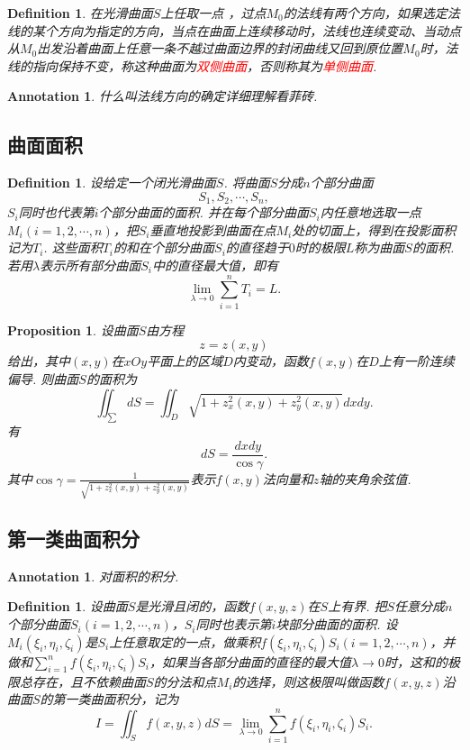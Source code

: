 \documentclass{article}
\newtheorem{proposition}[theorem]{Proposition}
\newtheorem{definition}[theorem]{Definition}
\newtheorem{annotation}[theorem]{Annotation}
\newcommand{\redt}[1]{\textcolor{red}{#1}}
\begin{document}
\begin{definition}
\rm 在光滑曲面$S$上任取一点 ，过点$M_0$的法线有两个方向，如果选定法线的某个方向为指定的方向，当点在曲面上连续移动时，法线也连续变动、当动点从$M_0$出发沿着曲面上任意一条不越过曲面边界的封闭曲线又回到原位置$M_0$时，法线的指向保持不变，称这种曲面为\redt{双侧曲面}，否则称其为\redt{单侧曲面}.
\end{definition}

\begin{annotation}
\rm 什么叫法线方向的确定详细理解看菲砖.
\end{annotation}

\subsection{曲面面积}

\begin{definition}
\rm 设给定一个闭光滑曲面$S$. 将曲面$S$分成$n$个部分曲面
$$
S_1, S_2,\cdots,S_n,
$$
$S_i$同时也代表第$i$个部分曲面的面积. 并在每个部分曲面$S_i$内任意地选取一点$M_i(i=1,2,\cdots,n)$，把$S_i$垂直地投影到曲面在点$M_i$处的切面上，得到在投影面积记为$T_i$. 这些面积$T_i$的和在个部分曲面$S_i$的直径趋于$0$时的极限$L$称为曲面$S$的面积. 若用$\lambda$表示所有部分曲面$S_i$中的直径最大值，即有
$$
\lim\limits_{\lambda \to 0}\sum\limits_{i=1}^n T_i = L.
$$
\end{definition}

\begin{proposition}
\rm 设曲面$S$由方程
$$
z=z(x,y)
$$
给出，其中$(x,y)$在$xOy$平面上的区域$D$内变动，函数$f(x,y)$在$D$上有一阶连续偏导. 则曲面$S$的面积为
$$
\iint_\sum dS = \iint_D\sqrt{1+z_x^2(x,y)+z_y^2(x,y)}dxdy.
$$
有
$$
dS = \frac{dxdy}{\cos \gamma}.
$$
其中$\cos\gamma = \frac{1}{\sqrt{1+z_x^2(x,y)+z_y^2(x,y)}}$表示$f(x,y)$法向量和$z$轴的夹角余弦值. 
\end{proposition}

\subsection{第一类曲面积分}

\begin{annotation}
\rm 对面积的积分.
\end{annotation}

\begin{definition}
\rm 设曲面$S$是光滑且闭的，函数$f(x,y,z)$在$S$上有界. 把$S$任意分成$n$个部分曲面$S_i(i=1,2,\cdots,n)$，$S_i$同时也表示第$i$块部分曲面的面积. 设$M_i(\xi_i,\eta_i,\zeta_i)$是$S_i$上任意取定的一点，做乘积$f(\xi_i,\eta_i,\zeta_i)S_i(i=1,2,\cdots,n)$，并做和$\sum\limits_{i=1}^n f(\xi_i,\eta_i,\zeta_i)S_i$，如果当各部分曲面的直径的最大值$\lambda \to 0$时，这和的极限总存在，且不依赖曲面$S$的分法和点$M_i$的选择，则这极限叫做函数$f(x,y,z)$沿曲面$S$的第一类曲面积分，记为
$$
I = \iint_{S} f(x,y,z)dS = \lim\limits_{\lambda \to 0}\sum\limits_{i=1}^n f(\xi_i,\eta_i,\zeta_i)S_i.
$$
\end{definition}
\end{document}
